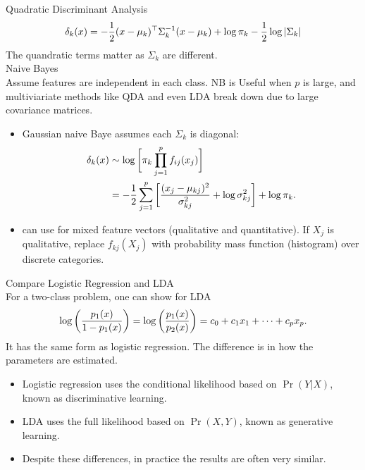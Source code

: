 \documentclass[11pt, a4paper]{article}
\begin{document}
  Quadratic Discriminant Analysis
  \[
    \delta_k(x)=-{1\over2}(x-\mu_k)^\top \Sigma_k^{-1}(x-\mu_k)+\log\pi_k-{1\over2}\log|\Sigma_k|
  \]
  The quandratic terms matter as $\Sigma_k$ are different.\\[1mm]
Naive Bayes\\
Assume features are independent in each class. NB is Useful when $p$ is large, and multiviariate methods like QDA and even LDA break down due to large covariance matrices.
\begin{itemize}
  \item Gaussian naive Baye assumes each $\Sigma_k$ is diagonal:
    \begin{align}
    \delta_k(x) & \sim \log\bigg[\pi_k\prod_{j=1}^pf_{ij}(x_j)\bigg]\\
    & = -{1\over2}\sum_{j=1}^p\bigg[\frac{(x_j-\mu_{kj})^2}{\sigma^2_{kj}}+\log\sigma^2_{kj}\bigg]+\log\pi_k.
  \end{align}
\item can use for mixed feature vectors (qualitative and quantitative). If $X_j$ is qualitative, replace $f_{kj}(X_j)$ with probability mass function (histogram) over discrete categories.
\end{itemize}
Compare Logistic Regression and LDA\\
For a two-class problem, one can show for LDA
\[
  \log\bigg({p_1(x)\over{1-p_1(x)}}\bigg)=\log\bigg(\frac{p_1(x)}{p_2(x)}\bigg)=c_0+c_1x_1+\dots+c_px_p.
\]
It has the same form as logistic regression. The difference is in how the parameters are estimated.
\begin{itemize}
  \item Logistic regression uses the conditional likelihood based on $\operatorname{Pr}(Y|X)$, known as discriminative learning.
  \item LDA uses the full likelihood based on $\operatorname{Pr}(X,Y)$, known as generative learning.
  \item Despite these differences, in practice the results are often very similar.
\end{itemize}
\end{document}
